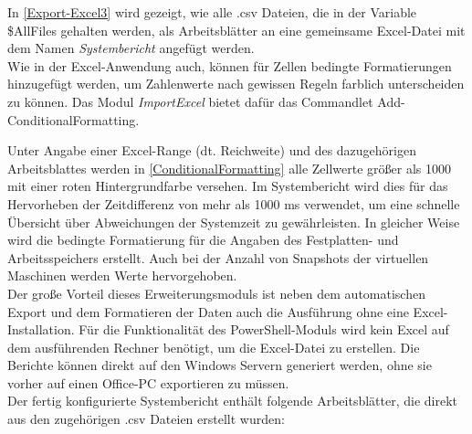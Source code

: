 
In \autoref{Export-Excel3} wird gezeigt, wie alle .csv Dateien, die in der Variable \$AllFiles gehalten werden, als Arbeitsblätter an eine gemeinsame Excel-Datei mit dem Namen \textit{Systembericht} angefügt werden.\medskip\\
Wie in der Excel-Anwendung auch, können für Zellen bedingte Formatierungen hinzugefügt werden, um Zahlenwerte nach gewissen Regeln farblich unterscheiden zu können. Das Modul \textit{ImportExcel} bietet dafür das Commandlet Add-ConditionalFormatting.

Unter Angabe einer Excel-Range (dt. Reichweite) und des dazugehörigen Arbeitsblattes werden in \autoref{ConditionalFormatting} alle Zellwerte größer als 1000 mit einer roten Hintergrundfarbe versehen. Im Systembericht wird dies für das Hervorheben der Zeitdifferenz von mehr als 1000 ms verwendet, um eine schnelle Übersicht über Abweichungen der Systemzeit zu gewährleisten. In gleicher Weise wird die bedingte Formatierung für die Angaben des Festplatten- und Arbeitsspeichers erstellt. Auch bei der Anzahl von Snapshots der virtuellen Maschinen werden Werte hervorgehoben.\medskip\\
Der große Vorteil dieses Erweiterungsmoduls ist neben dem automatischen Export und dem Formatieren der Daten auch die Ausführung ohne eine Excel-Installation. Für die Funktionalität des PowerShell-Moduls wird kein Excel auf dem ausführenden Rechner benötigt, um die Excel-Datei zu erstellen. Die Berichte können direkt auf den Windows Servern generiert werden, ohne sie vorher auf einen Office-PC exportieren zu müssen.\medskip\\
Der fertig konfigurierte Systembericht enthält folgende Arbeitsblätter, die direkt aus den zugehörigen .csv Dateien erstellt wurden:\\
